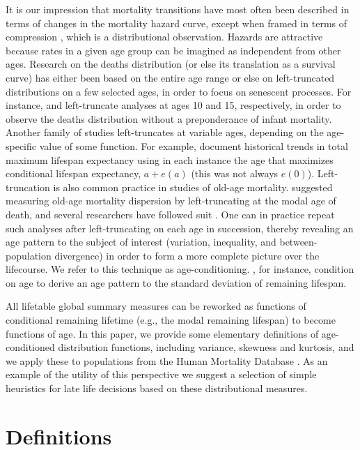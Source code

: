 \documentclass{article}
\begin{document}
It is our impression that mortality transitions have most
often been described in terms of changes in the mortality hazard curve, except
when framed in terms of compression \citep[e.g.,][]{fries1980aging}, which is a
distributional observation.
Hazards are attractive because rates in a given
age group can be imagined as independent from other ages. Research on
the deaths distribution (or else its translation as a survival curve) has either
been based on the entire age range
\citep[e.g.,][]{wilmoth1999rectangularization}
or else on left-truncated distributions on a few selected ages, in order to
focus on senescent processes.
For instance, \citet{edwards2005inequality} and \citet{gillespie2014divergence} left-truncate analyses at
ages 10 and 15, respectively, in order to observe the deaths distribution
without a preponderance of infant mortality. Another family of studies
left-truncates at variable ages, depending on the age-specific value of some
function. For example, \citet{romo2009maximum} document historical trends in
total maximum lifespan expectancy using in each instance the age that maximizes 
conditional lifespan expectancy, $a + e(a)$ (this was not
always $e(0)$). Left-truncation is also common practice in studies of old-age
mortality.
\citet{kannisto2001mode} suggested measuring old-age mortality dispersion by
left-truncating at the modal age of death, and several researchers have followed
suit \citep[e.g.,][among others]{thatcher2010, ouellette2011}. One can in
practice repeat such analyses after left-truncating on each age in
succession, thereby revealing an age pattern to the subject of interest (variation, inequality, and
between-population divergence) in order to form a more complete picture over
the lifecourse. We refer to this technique as age-conditioning.
\citet{engelman2010implications}, for instance, condition on age to derive an
age pattern to the standard deviation of remaining lifespan.

All lifetable global
summary measures can be reworked as functions of conditional remaining lifetime
(e.g., the modal remaining lifespan) to become functions of age.
In this paper, we provide some elementary definitions of age-conditioned
distribution functions, including variance, skewness and kurtosis, and we apply
these to populations from the Human Mortality Database .
As an example of the utility of this perspective we suggest a selection of
simple heuristics for late life decisions based on these distributional measures.

\section*{Definitions}
\end{document}
